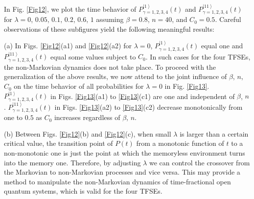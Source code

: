 \documentclass[
showpacs,  %
showkeys,  %
aps,       %
amsthm,    %
amsmath,   %
amsfonts,  %
amssymb    %
]{revtex4-1}          %
\begin{document}
In Fig. \ref{Fig12}, we plot the time behavior of $P^{\left|{1}\right\rangle}_{\gamma=1,2,3,4}(t)$ and $P^{\left|{11}\right\rangle}_{\gamma=1,2,3,4}(t)$ for $\lambda=0$, $0.05$, $0.1$, $0.2$, $0.6$, $1$ assuming $\beta=0.8$, $n=40$, and $C_0=0.5$. Careful observations of these subfigures yield the following meaningful results:

(a) In Figs. \ref{Fig12}(a1) and \ref{Fig12}(a2) for $\lambda=0$, $P^{\left|{1}\right\rangle}_{\gamma=1,2,3,4}(t)$ equal one and $P^{\left|{11}\right\rangle}_{\gamma=1,2,3,4}(t)$ equal some values subject to $C_0$. In such cases for the four TFSEs, the non-Markovian dynamics does not take place. To proceed with the generalization of the above results, we now attend to the joint influence of $\beta$, $n$, $C_0$ on the time behavior of all probabilities for $\lambda=0$ in Fig. \ref{Fig13}. $P^{\left|{1}\right\rangle}_{\gamma=1,2,3,4}(t)$ in Figs. \ref{Fig13}(a1) to \ref{Fig13}(c1) are one and independent of $\beta$, $n$. $P^{\left|{11}\right\rangle}_{\gamma=1,2,3,4}(t)$ in Figs. \ref{Fig13}(a2) to \ref{Fig13}(c2) decrease monotonically from one to $0.5$ as $C_0$ increases regardless of $\beta$, $n$.

(b) Between Figs. \ref{Fig12}(b) and \ref{Fig12}(c), when small $\lambda$ is larger than a certain critical value, the transition point of $P(t)$ from a monotonic function of $t$ to a non-monotonic one is just the point at which the memoryless environment turns into the memory one. Therefore, by adjusting $\lambda$ we can control the crossover from the Markovian to non-Markovian processes and vice versa. This may provide a method to manipulate the non-Markovian dynamics of time-fractional open quantum systems, which is valid for the four TFSEs.
\end{document}

